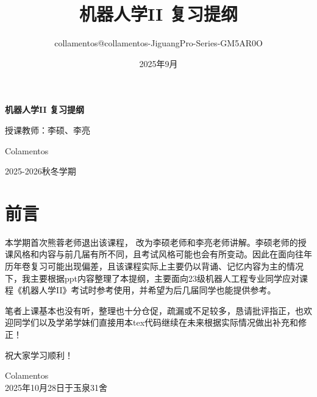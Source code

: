 \documentclass[a4paper,11pt]{article}
\title{机器人学II 复习提纲 \\ \vspace{0.5cm} \large }
\author{collamentos@collamentos-JiguangPro-Series-GM5AR0O}
\date{2025年9月}
\begin{document}
\begin{titlepage}
    \centering
    \vspace*{3cm}
    {\Huge \textbf{机器人学II 复习提纲} \par}
    \vspace{0.5cm}
    {\Large 授课教师：李硕、李亮\par}
    \vspace{3cm}
    {\Large Colamentos \par}
    {\Large 2025-2026秋冬学期 \par}
\end{titlepage}

\section*{前言}

本学期首次熊蓉老师退出该课程， 改为李硕老师和李亮老师讲解。李硕老师的授课风格和内容与前几届有所不同，且考试风格可能也会有所变动。因此在面向往年历年卷复习可能出现偏差，且该课程实际上主要仍以背诵、记忆内容为主的情况下，我主要根据ppt内容整理了本提纲，主要面向23级机器人工程专业同学应对课程《机器人学II》考试时参考使用，并希望为后几届同学也能提供参考。

笔者上课基本也没有听，整理也十分仓促，疏漏或不足较多，恳请批评指正，也欢迎同学们以及学弟学妹们直接用本tex代码继续在未来根据实际情况做出补充和修正！

祝大家学习顺利！

\begin{flushright}
Colamentos\\
2025年10月28日于玉泉31舍
\end{flushright}
\newpage
\tableofcontents
\thispagestyle{empty}
\newpage


\end{document}

